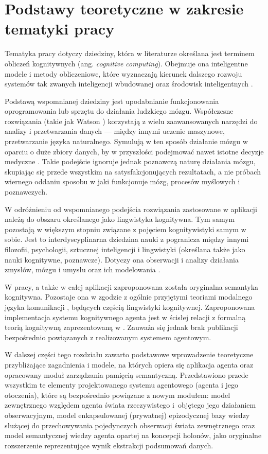 ﻿
\chapter{Podstawy teoretyczne w zakresie tematyki pracy}

Tematyka pracy dotyczy dziedziny, która w literaturze określana jest terminem obliczeń kognitywnych (ang. \textit{cognitive computing}). Obejmuje ona inteligentne modele i metody obliczeniowe, które wyznaczają kierunek dalszego rozwoju systemów tak zwanych inteligencji wbudowanej oraz środowisk inteligentnych \cite{hur15}.

Podstawą wspomnianej dziedziny jest upodabnianie funkcjonowania oprogramowania lub sprzętu do działania ludzkiego mózgu. Współczesne rozwiązania (takie jak  Watson \cite{kel13}) korzystają z wielu zaawansowanych narzędzi do analizy i przetwarzania danych --- między innymi uczenie maszynowe, przetwarzanie języka naturalnego. Symulują w ten sposób działanie mózgu w oparciu o duże zbiory danych, by w przyszłości podejmować nawet istotne decyzje medyczne \cite{woo15}. Takie podejście ignoruje jednak poznawczą naturę działania mózgu, skupiając się przede wszystkim na satysfakcjonujących rezultatach, a nie próbach wiernego oddaniu sposobu w jaki funkcjonuje mózg, procesów myślowych i poznawczych.

W odróżnieniu od wspomnianego podejścia rozwiązania zastosowane w aplikacji należą do obszaru określanego jako lingwistyka kognitywna. Tym samym pozostają w większym stopniu związane z pojęciem kognitywistyki samym w sobie. Jest to interdyscyplinarna dziedzina nauki z pogranicza między innymi filozofii, psychologii, sztucznej inteligencji i lingwistyki (określana także jako nauki kognitywne, poznawcze). Dotyczy ona obserwacji i analizy działania zmysłów, mózgu i umysłu oraz ich modelowania \cite{tha17}.

W pracy, a także w całej aplikacji zaproponowana została oryginalna semantyka kognitywna. Pozostaje ona w zgodzie z ogólnie przyjętymi teoriami modalnego języka komunikacji \cite{tal00}, będących częścią lingwistyki kognitywnej. Zaproponowana implementacja systemu kognitywnego agenta jest w ścisłej relacji z formalną teorią kognitywną zaprezentowaną w \cite{kat07}. Zauważa się jednak brak publikacji bezpośrednio powiązanych z realizowanym systemem agentowym.

W dalszej części tego rozdziału zawarto podstawowe wprowadzenie teoretyczne przybliżające zagadnienia i modele, na których opiera się aplikacja agenta oraz opracowany moduł zarządzania pamięcią semantyczną. Przedstawiono przede wszystkim te elementy projektowanego systemu agentowego (agenta i jego otoczenia), które są bezpośrednio powiązane z nowym modułem: model zewnętrznego względem agenta świata rzeczywistego i~objętego jego działaniem obserwacyjnym, model enkapsulowanej (prywatnej) epizodycznej bazy wiedzy służącej do przechowywania pojedynczych obserwacji świata zewnętrznego oraz model semantycznej wiedzy agenta opartej na koncepcji holonów, jako oryginalne rozszerzenie reprezentujące wynik ekstrakcji podsumowań danych.

